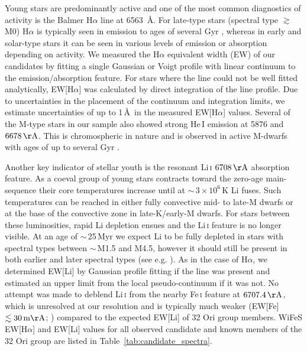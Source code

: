 \documentclass[usenatbib]{mnras}
\begin{document}
Young stars are predominantly active and one of the most common
diagnostics of activity is the Balmer H$\alpha$ line at 6563~\AA. For
late-type stars (spectral type $\gtrsim$ M0) H$\alpha$ is typically
seen in emission to ages of several Gyr \citep*[e.g.][]{Gizis02},
whereas in early and solar-type stars it can be seen in various levels
of emission or absorption depending on activity. We measured the
H$\alpha$ equivalent width (EW) of our candidates by fitting a single
Gaussian or Voigt profile with linear continuum to the
emission/absorption feature. For stars where the line could not be
well fitted analytically, EW[H$\alpha$] was calculated by direct
integration of the line profile. Due to uncertainties in the placement
of the continuum and integration limits, we estimate uncertainties of
up to 1\,\AA\ in the measured EW[H$\alpha$] values. Several of the
M-type stars in our sample also showed strong He\,{\footnotesize{I}}
emission at 5876 and $6678\,\rm{\AA}$. This is chromospheric in nature
and is observed in active M-dwarfs with ages of up to several Gyr
\citep{Gizis02}.

Another key indicator of stellar youth is the resonant Li\,\textsc{i}
$6708\,\rm{\AA}$ absorption feature. As a coeval group of young stars
contracts toward the zero-age main-sequence their core temperatures
increase until at $\sim$\,$3 \times 10^{6}$\,K Li fuses. Such
temperatures can be reached in either fully convective mid- to late-M
dwarfs or at the base of the convective zone in late-K/early-M
dwarfs. For stars between these luminosities, rapid Li depletion
ensues and the Li\,\textsc{i} feature is no longer visible. At an age
of $\sim$\,25\,Myr we expect Li to be fully depleted in stars with
spectral types between $\sim$\,M1.5 and M4.5, however it should still
be present in both earlier and later spectral types (see
e.g. \citealp{Mentuch08,Jeffries13}). As in the case of H$\alpha$, we
determined EW[Li] by Gaussian profile fitting if the line was present
and estimated an upper limit from the local pseudo-continuum if it was
not. No attempt was made to deblend Li\,\textsc{i} from the nearby
Fe\,\textsc{i} feature at $6707.4\,\rm{\AA}$, which is unresolved at
our resolution and is typically much weaker (EW[Fe]\,$\lesssim
30\,\rm{m\AA}$; \citealp{Soderblom93}) compared to the expected EW[Li]
of 32 Ori group members.  WiFeS EW[H$\alpha$] and EW[Li] values for
all observed candidate and known members of the 32 Ori group are listed in 
Table~\ref{tab:candidate_spectra}.
\end{document}
